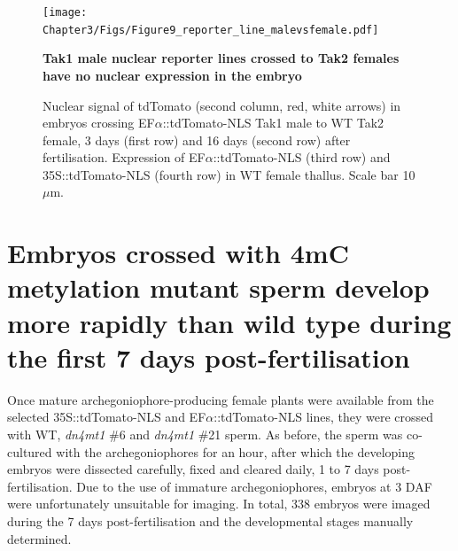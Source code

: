 \begin{figure}[htbp!] 
\centering    
    \texttt{[image: Chapter3/Figs/Figure9\_reporter\_line\_malevsfemale.pdf]}
\caption{\textbf{Tak1 male nuclear reporter lines crossed to Tak2 females have no nuclear expression in the embryo}}
\label{fig:malevsfemale}
\captionsetup{font=small}
    \caption*{Nuclear signal of tdTomato (second column, red, white arrows) in embryos crossing EF$\alpha$::tdTomato-NLS Tak1 male to WT Tak2 female, 3 days (first row) and 16 days (second row) after fertilisation. Expression of EF$\alpha$::tdTomato-NLS (third row) and  35S::tdTomato-NLS (fourth row) in WT female thallus. Scale bar 10$\mu$m.}
\end{figure}

\section{Embryos crossed with 4mC metylation mutant sperm develop more rapidly than wild type during the first 7 days post-fertilisation}

Once mature archegoniophore-producing female plants were available from the selected 35S::tdTomato-NLS and EF$\alpha$::tdTomato-NLS lines, they were crossed with WT, \textit{dn4mt1} \#6 and \textit{dn4mt1} \#21 sperm. As before, the sperm was co-cultured with the archegoniophores for an hour, after which the developing embryos were dissected carefully, fixed and cleared daily, 1 to 7 days post-fertilisation. Due to the use of immature archegoniophores, embryos at 3 DAF were unfortunately unsuitable for imaging. In total, 338 embryos were imaged during the 7 days post-fertilisation and the developmental stages manually determined. 

